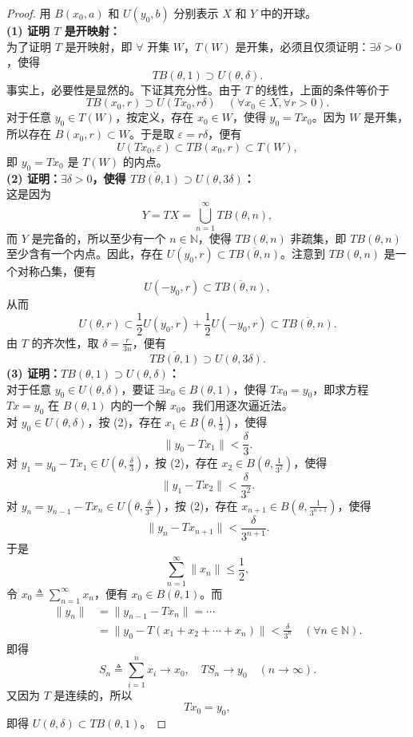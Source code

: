 \documentclass[lang=cn,newtx,10pt,scheme=chinese,thmcnt=chapter]{elegantbook}
\begin{document}
\begin{proof}
	用 $B(x_0, a)$ 和 $U(y_0, b)$ 分别表示 $X$ 和 $Y$ 中的开球。\\
	\textbf{(1) 证明 $T$ 是开映射：}\\
	为了证明 $T$ 是开映射，即 $\forall$ 开集 $W$，$T(W)$ 是开集，必须且仅须证明：$\exists \delta > 0$，使得
	\[
	T B(\theta, 1) \supset U(\theta, \delta).
	\]
	事实上，必要性是显然的。下证其充分性。由于 $T$ 的线性，上面的条件等价于
	\[
	T B(x_0, r) \supset U(T x_0, r \delta) \quad (\forall x_0 \in X, \forall r > 0).
	\]
	对于任意 $y_0 \in T(W)$，按定义，存在 $x_0 \in W$，使得 $y_0 = T x_0$。因为 $W$ 是开集，所以存在 $B(x_0, r) \subset W$。于是取 $\varepsilon = r \delta$，便有
	\[
	U(T x_0, \varepsilon) \subset T B(x_0, r) \subset T(W),
	\]
	即 $y_0 = T x_0$ 是 $T(W)$ 的内点。\\
	\textbf{(2) 证明：$\exists \delta > 0$，使得 $\overline{T B(\theta, 1)} \supset U(\theta, 3\delta)$：}\\
	这是因为
	\[
	Y = T X = \bigcup_{n=1}^{\infty} T B(\theta, n),
	\]
	而 $Y$ 是完备的，所以至少有一个 $n \in \mathbb{N}$，使得 $T B(\theta, n)$ 非疏集，即 $T B(\theta, n)$ 至少含有一个内点。因此，存在 $U(y_0, r) \subset \overline{T B(\theta, n)}$。注意到 $T B(\theta, n)$ 是一个对称凸集，便有
	\[
	U(-y_0, r) \subset \overline{T B(\theta, n)},
	\]
	从而
	\[
	U(\theta, r) \subset \frac{1}{2} U(y_0, r) + \frac{1}{2} U(-y_0, r) \subset \overline{T B(\theta, n)}.
	\]
	由 $T$ 的齐次性，取 $\delta = \frac{r}{3n}$，便有
	\[
	\overline{T B(\theta, 1)} \supset U(\theta, 3\delta).
	\]
	\textbf{(3) 证明：$T B(\theta, 1) \supset U(\theta, \delta)$：}\\
	对于任意 $y_0 \in U(\theta, \delta)$，要证 $\exists x_0 \in B(\theta, 1)$，使得 $T x_0 = y_0$，即求方程 $T x = y_0$ 在 $B(\theta, 1)$ 内的一个解 $x_0$。我们用逐次逼近法。\\
	对 $y_0 \in U(\theta, \delta)$，按 (2)，存在 $x_1 \in B(\theta, \frac{1}{3})$，使得
	\[
	\|y_0 - T x_1\| < \frac{\delta}{3}.
	\]
	对 $y_1 = y_0 - T x_1 \in U(\theta, \frac{\delta}{3})$，按 (2)，存在 $x_2 \in B(\theta, \frac{1}{3^2})$，使得
	\[
	\|y_1 - T x_2\| < \frac{\delta}{3^2}.
	\]
	对 $y_n = y_{n-1} - T x_n \in U(\theta, \frac{\delta}{3^n})$，按 (2)，存在 $x_{n+1} \in B(\theta, \frac{1}{3^{n+1}})$，使得
	\[
	\|y_n - T x_{n+1}\| < \frac{\delta}{3^{n+1}}.
	\]
	于是
	\[
	\sum_{n=1}^{\infty} \|x_n\| \leqslant \frac{1}{2},
	\]
	令 $x_0 \triangleq \sum_{n=1}^{\infty} x_n$，便有 $x_0 \in B(\theta, 1)$。而
	\[
	\begin{aligned}
		\|y_n\| &= \|y_{n-1} - T x_n\| = \cdots \\
		&= \|y_0 - T(x_1 + x_2 + \cdots + x_n)\| < \frac{\delta}{3^n} \quad (\forall n \in \mathbb{N}).
	\end{aligned}
	\]
	即得
	\[
	S_n \triangleq \sum_{i=1}^n x_i \to x_0, \quad T S_n \to y_0 \quad (n \to \infty).
	\]
	又因为 $T$ 是连续的，所以
	\[
	T x_0 = y_0,
	\]
	即得 $U(\theta, \delta) \subset T B(\theta, 1)$。
\end{proof}
\end{document}
